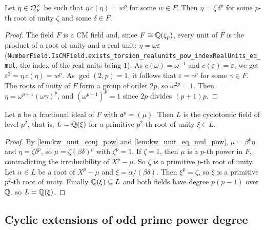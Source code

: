 \begin{lemma}
  \label{lem:kw_unit_eq_mul_pow}
  \leanok
  Let $\eta \in \mathcal{O}_F^\times$ be such that $\eta\,c(\eta) = w^p$ for some $w \in F$. Then
  $\eta = \zeta\,\delta^p$ for some $p$-th root of unity $\zeta$ and some $\delta \in F$.
\end{lemma}

\begin{proof}
  \leanok
  The field $F$ is a CM field and, since $F \cong \mathbb{Q}(\zeta_p)$, every unit of $F$ is the product
  of a root of unity and a real unit: $\eta = \omega\varepsilon$
  (\texttt{NumberField.IsCMField.exists\_torsion\_realunits\_pow\_indexRealUnits\_eq\_mul}, the
  index of the real units being $1$). As $c(\omega) = \omega^{-1}$ and $c(\varepsilon) =
  \varepsilon$, we get $\varepsilon^2 = \eta\,c(\eta) = w^p$. As $\gcd(2,p) = 1$, it follows that
  $\varepsilon = \gamma^p$ for some $\gamma \in F$. The roots of unity of $F$ form a group of order
  $2p$, so $\omega^{2p} = 1$. Then $\eta = \omega^{p+1}(\omega\gamma)^p$, and
  $(\omega^{p+1})^p = 1$ since $2p$ divides $(p+1)p$.
\end{proof}

\begin{lemma}
  \label{lem:kw_unit_root_of_unity}
  \leanok
  Let $\mathfrak{a}$ be a fractional ideal of $F$ with $\mathfrak{a}^p = (\mu)$. Then $L$ is the
  cyclotomic field of level $p^2$, that is, $L = \mathbb{Q}(\xi)$ for a primitive $p^2$-th root of unity
  $\xi \in L$.
\end{lemma}

\begin{proof}
  \leanok
  By \ref{lem:kw_unit_conj_pow} and \ref{lem:kw_unit_eq_mul_pow}, $\mu = \beta^p\eta$ and
  $\eta = \zeta\delta^p$, so $\mu = \zeta(\beta\delta)^p$ with $\zeta^p = 1$. If $\zeta = 1$, then
  $\mu$ is a $p$-th power in $F$, contradicting the irreducibility of $X^p - \mu$. So $\zeta$ is a
  primitive $p$-th root of unity. Let $\alpha \in L$ be a root of $X^p - \mu$ and
  $\xi = \alpha/(\beta\delta)$. Then $\xi^p = \zeta$, so $\xi$ is a primitive $p^2$-th root of
  unity. Finally $\mathbb{Q}(\xi) \subseteq L$ and both fields have degree $p(p-1)$ over $\mathbb{Q}$, so
  $L = \mathbb{Q}(\xi)$.
\end{proof}

\subsection{Cyclic extensions of odd prime power degree}

